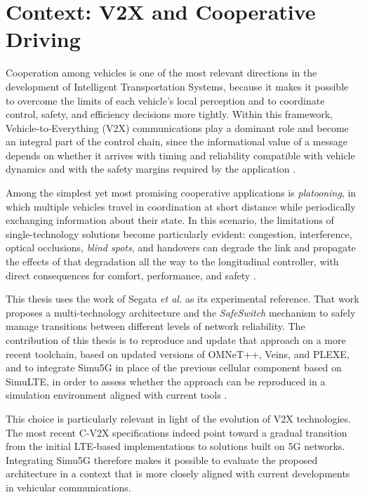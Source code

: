 \section{Context: V2X and Cooperative Driving}

Cooperation among vehicles is one of the most relevant directions in the development of Intelligent Transportation Systems, because it makes it possible to overcome the limits of each vehicle's local perception and to coordinate control, safety, and efficiency decisions more tightly. Within this framework, Vehicle-to-Everything (V2X) communications play a dominant role and become an integral part of the control chain, since the informational value of a message depends on whether it arrives with timing and reliability compatible with vehicle dynamics and with the safety margins required by the application \cite{dressler2019cooperative,giordano2019joint,segata2016safe}.

Among the simplest yet most promising cooperative applications is \emph{platooning}, in which multiple vehicles travel in coordination at short distance while periodically exchanging information about their state. In this scenario, the limitations of single-technology solutions become particularly evident: congestion, interference, optical occlusions, \emph{blind spots}, and handovers can degrade the link and propagate the effects of that degradation all the way to the longitudinal controller, with direct consequences for comfort, performance, and safety \cite{segata2015communication,bazzi2020wireless,segata2023multi-technology}.

This thesis uses the work of Segata \emph{et al.} \cite{segata2023multi-technology} as its experimental reference. That work proposes a multi-technology architecture and the \emph{SafeSwitch} mechanism to safely manage transitions between different levels of network reliability. The contribution of this thesis is to reproduce and update that approach on a more recent toolchain, based on updated versions of OMNeT++, Veins, and PLEXE, and to integrate Simu5G in place of the previous cellular component based on SimuLTE, in order to assess whether the approach can be reproduced in a simulation environment aligned with current tools \cite{nardini2020simu5g,virdis2014simulte}.

This choice is particularly relevant in light of the evolution of V2X technologies. The most recent C-V2X specifications indeed point toward a gradual transition from the initial LTE-based implementations to solutions built on 5G networks. Integrating Simu5G therefore makes it possible to evaluate the proposed architecture in a context that is more closely aligned with current developments in vehicular communications.
